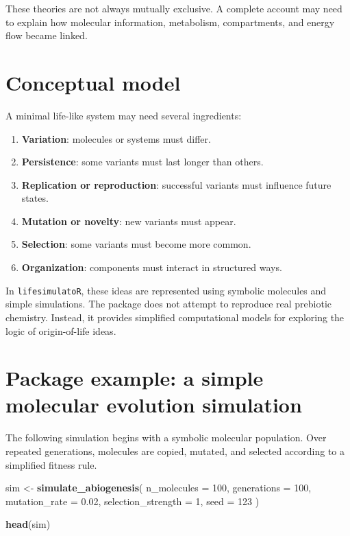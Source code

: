 \documentclass[
  oneside,
  openany]{book}
\newenvironment{Shaded}{\begin{snugshade}}{\end{snugshade}}
\newcommand{\AttributeTok}[1]{\textcolor[rgb]{0.13,0.29,0.53}{#1}}
\newcommand{\DecValTok}[1]{\textcolor[rgb]{0.00,0.00,0.81}{#1}}
\newcommand{\FloatTok}[1]{\textcolor[rgb]{0.00,0.00,0.81}{#1}}
\newcommand{\FunctionTok}[1]{\textcolor[rgb]{0.13,0.29,0.53}{\textbf{#1}}}
\newcommand{\NormalTok}[1]{#1}
\newcommand{\OtherTok}[1]{\textcolor[rgb]{0.56,0.35,0.01}{#1}}
\providecommand{\tightlist}{%
  \setlength{\itemsep}{0pt}\setlength{\parskip}{0pt}}
\begin{document}
These theories are not always mutually exclusive. A complete account may need to explain how molecular information, metabolism, compartments, and energy flow became linked.

\section{Conceptual model}\label{conceptual-model}

A minimal life-like system may need several ingredients:

\begin{enumerate}
\def\labelenumi{\arabic{enumi}.}
\tightlist
\item
  \textbf{Variation}: molecules or systems must differ.
\item
  \textbf{Persistence}: some variants must last longer than others.
\item
  \textbf{Replication or reproduction}: successful variants must influence future states.
\item
  \textbf{Mutation or novelty}: new variants must appear.
\item
  \textbf{Selection}: some variants must become more common.
\item
  \textbf{Organization}: components must interact in structured ways.
\end{enumerate}

In \texttt{lifesimulatoR}, these ideas are represented using symbolic molecules and simple simulations. The package does not attempt to reproduce real prebiotic chemistry. Instead, it provides simplified computational models for exploring the logic of origin-of-life ideas.

\section{Package example: a simple molecular evolution simulation}\label{package-example-a-simple-molecular-evolution-simulation}

The following simulation begins with a symbolic molecular population. Over repeated generations, molecules are copied, mutated, and selected according to a simplified fitness rule.

\begin{Shaded}
\begin{Highlighting}[]
\NormalTok{sim }\OtherTok{\textless{}{-}} \FunctionTok{simulate\_abiogenesis}\NormalTok{(}
  \AttributeTok{n\_molecules =} \DecValTok{100}\NormalTok{,}
  \AttributeTok{generations =} \DecValTok{100}\NormalTok{,}
  \AttributeTok{mutation\_rate =} \FloatTok{0.02}\NormalTok{,}
  \AttributeTok{selection\_strength =} \DecValTok{1}\NormalTok{,}
  \AttributeTok{seed =} \DecValTok{123}
\NormalTok{)}

\FunctionTok{head}\NormalTok{(sim)}
\end{Highlighting}
\end{Shaded}
\end{document}
